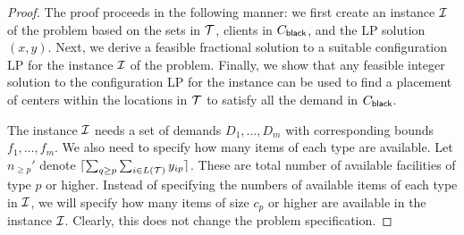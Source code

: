 \begin{proof}
The proof proceeds in the following manner: we first create an instance ${\cal I}$ of the \cckp problem based on the sets in ${\cal T}$, clients in $C_{\mathsf{black}}$, and the LP solution $(x,y)$. Next, we derive a feasible fractional solution to a suitable configuration LP for the instance ${\cal I}$ of the \cckp problem. Finally, we show that any feasible integer solution to the configuration LP for the \cckp instance can be used to find a placement of centers within the
locations in ${\cal T}$ to satisfy all the demand in $C_{\mathsf{black}}$.

The instance ${\cal I}$ needs a set of demands $D_1, \ldots, D_m$ with corresponding bounds $f_1, \ldots, f_m$. We also need to specify how
many items of each type are available. Let $n_{\geq p}'$ denote $\lceil\sum_{q \geq p} \sum_{i \in L({\cal T})} y_{ip}\rceil$. These are total
number of available facilities of type $p$ or higher. Instead of specifying the numbers of available items of each type in ${\cal I}$, we will specify
how many items of size $c_p$ or higher are available in the instance ${\cal I}$. Clearly, this does not change the problem specification. 


\end{proof}
